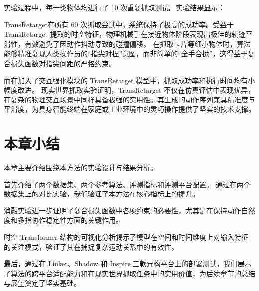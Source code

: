 实验过程中，每一类物体均进行了 10 次重复抓取测试。实验结果显示：

TransRetarget在所有 60 次抓取尝试中，系统保持了极高的成功率。受益于 TransRetarget 提取的时空特征，物理机械手在接近物体阶段表现出极佳的轨迹平滑性，有效避免了因动作抖动导致的碰撞偏移。
在抓取卡片等细小物体时，算法能够精准复现人类操作员的“指尖对捏”意图，而非简单的“全手合拢”，这得益于复合损失函数对指尖间距的严格约束。

而在加入了交互强化模块的 TransRetarget 模型中，抓取成功率和执行时间均有小幅度改进。
现实世界抓取实验证明，TransRetarget 不仅在仿真评估中表现优异，在复杂的物理交互场景中同样具备极强的实用性。其生成的动作序列兼具精准度与平滑度，为具身智能终端在家庭或工业环境中的灵巧操作提供了坚实的技术支撑。
\section{本章小结}
本章主要介绍围绕本方法的实验设计与结果分析。

首先介绍了两个数据集、两个参考算法、评测指标和评测平台配置。
通过在两个数据集上的对比实验，我们验证了本方法在核心指标上的提升。

消融实验进一步证明了复合损失函数中各项约束的必要性，尤其是在保持动作自然度和多指协作稳定性方面的关键作用。

时空 Transformer 结构的可视化分析揭示了模型在空间和时间维度上对输入特征的关注模式，验证了其在捕捉复杂运动关系中的有效性。

最后，通过在 Linker、Shadow 和 Inspire 三款异构平台上的部署测试，我们展示了算法的跨平台适配能力和在现实世界抓取任务中的实用价值，为后续章节的总结与展望奠定了坚实基础。